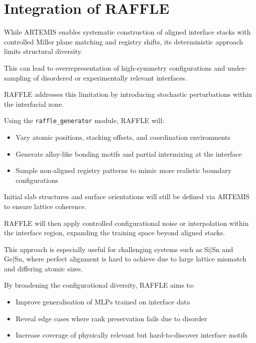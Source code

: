 \section{Integration of RAFFLE}


While ARTEMIS enables systematic construction of aligned interface stacks with controlled Miller plane matching and
registry shifts, its deterministic approach limits structural diversity.

This can lead to overrepresentation of high-symmetry configurations and under-sampling of disordered or experimentally
relevant interfaces.


RAFFLE addresses this limitation by introducing stochastic perturbations within the interfacial zone.

Using the \texttt{raffle\_generator} module, RAFFLE will:


\begin{itemize}
    \item Vary atomic positions, stacking offsets, and coordination environments
    \item Generate alloy-like bonding motifs and partial intermixing at the interface
    \item Sample non-aligned registry patterns to mimic more realistic boundary configurations
\end{itemize}


Initial slab structures and surface orientations will still be defined via ARTEMIS to ensure lattice coherence.

RAFFLE will then apply controlled configurational noise or interpolation within the interface region, expanding the
training space beyond aligned stacks.


This approach is especially useful for challenging systems such as Si|Sn and Ge|Sn, where perfect alignment is hard to
achieve due to large lattice mismatch and differing atomic sizes.

By broadening the configurational diversity, RAFFLE aims to:


\begin{itemize}
    \item Improve generalisation of MLPs trained on interface data
    \item Reveal edge cases where rank preservation fails due to disorder
    \item Increase coverage of physically relevant but hard-to-discover interface motifs
\end{itemize}

